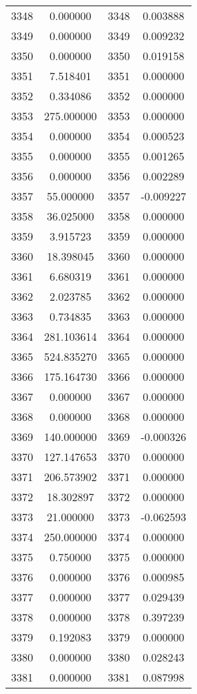 \documentclass[12pt]{article}
\begin{document}
\begin{longtable}{@{}cccc@{}}
3348 & 0.000000 & 3348 & 0.003888 \\
3349 & 0.000000 & 3349 & 0.009232 \\
3350 & 0.000000 & 3350 & 0.019158 \\
3351 & 7.518401 & 3351 & 0.000000 \\
3352 & 0.334086 & 3352 & 0.000000 \\
3353 & 275.000000 & 3353 & 0.000000 \\
3354 & 0.000000 & 3354 & 0.000523 \\
3355 & 0.000000 & 3355 & 0.001265 \\
3356 & 0.000000 & 3356 & 0.002289 \\
3357 & 55.000000 & 3357 & -0.009227 \\
3358 & 36.025000 & 3358 & 0.000000 \\
3359 & 3.915723 & 3359 & 0.000000 \\
3360 & 18.398045 & 3360 & 0.000000 \\
3361 & 6.680319 & 3361 & 0.000000 \\
3362 & 2.023785 & 3362 & 0.000000 \\
3363 & 0.734835 & 3363 & 0.000000 \\
3364 & 281.103614 & 3364 & 0.000000 \\
3365 & 524.835270 & 3365 & 0.000000 \\
3366 & 175.164730 & 3366 & 0.000000 \\
3367 & 0.000000 & 3367 & 0.000000 \\
3368 & 0.000000 & 3368 & 0.000000 \\
3369 & 140.000000 & 3369 & -0.000326 \\
3370 & 127.147653 & 3370 & 0.000000 \\
3371 & 206.573902 & 3371 & 0.000000 \\
3372 & 18.302897 & 3372 & 0.000000 \\
3373 & 21.000000 & 3373 & -0.062593 \\
3374 & 250.000000 & 3374 & 0.000000 \\
3375 & 0.750000 & 3375 & 0.000000 \\
3376 & 0.000000 & 3376 & 0.000985 \\
3377 & 0.000000 & 3377 & 0.029439 \\
3378 & 0.000000 & 3378 & 0.397239 \\
3379 & 0.192083 & 3379 & 0.000000 \\
3380 & 0.000000 & 3380 & 0.028243 \\
3381 & 0.000000 & 3381 & 0.087998 \\

\end{longtable}
\end{document}
